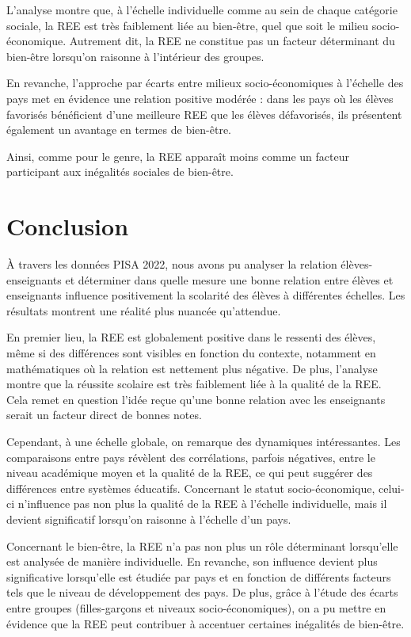 \documentclass[
  french,
  11pt,
  a4paper,
  oneside]{report}
\begin{document}
L'analyse montre que, à l'échelle individuelle comme au sein de chaque
catégorie sociale, la REE est très faiblement liée au bien-être, quel
que soit le milieu socio-économique. Autrement dit, la REE ne constitue
pas un facteur déterminant du bien-être lorsqu'on raisonne à l'intérieur
des groupes.

En revanche, l'approche par écarts entre milieux socio-économiques à
l'échelle des pays met en évidence une relation positive modérée : dans
les pays où les élèves favorisés bénéficient d'une meilleure REE que les
élèves défavorisés, ils présentent également un avantage en termes de
bien-être.

Ainsi, comme pour le genre, la REE apparaît moins comme un facteur
participant aux inégalités sociales de bien-être.

\chapter{Conclusion}\label{conclusion}

À travers les données PISA 2022, nous avons pu analyser la relation
élèves-enseignants et déterminer dans quelle mesure une bonne relation
entre élèves et enseignants influence positivement la scolarité des
élèves à différentes échelles. Les résultats montrent une réalité plus
nuancée qu'attendue.

En premier lieu, la REE est globalement positive dans le ressenti des
élèves, même si des différences sont visibles en fonction du contexte,
notamment en mathématiques où la relation est nettement plus négative.
De plus, l'analyse montre que la réussite scolaire est très faiblement
liée à la qualité de la REE. Cela remet en question l'idée reçue qu'une
bonne relation avec les enseignants serait un facteur direct de bonnes
notes.

Cependant, à une échelle globale, on remarque des dynamiques
intéressantes. Les comparaisons entre pays révèlent des corrélations,
parfois négatives, entre le niveau académique moyen et la qualité de la
REE, ce qui peut suggérer des différences entre systèmes éducatifs.
Concernant le statut socio-économique, celui-ci n'influence pas non plus
la qualité de la REE à l'échelle individuelle, mais il devient
significatif lorsqu'on raisonne à l'échelle d'un pays.

Concernant le bien-être, la REE n'a pas non plus un rôle déterminant
lorsqu'elle est analysée de manière individuelle. En revanche, son
influence devient plus significative lorsqu'elle est étudiée par pays et
en fonction de différents facteurs tels que le niveau de développement
des pays. De plus, grâce à l'étude des écarts entre groupes
(filles-garçons et niveaux socio-économiques), on a pu mettre en
évidence que la REE peut contribuer à accentuer certaines inégalités de
bien-être.
\end{document}
